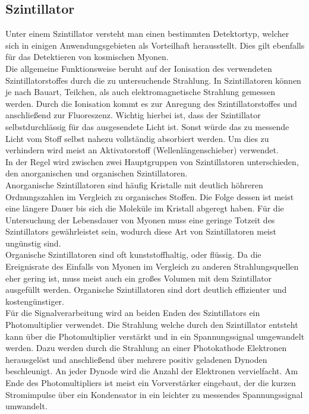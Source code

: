 \subsection{Szintillator}
Unter einem Szintillator versteht man einen bestimmten Detektortyp, welcher sich in einigen Anwendungsgebieten als Vorteilhaft herausstellt. Dies gilt ebenfalls für das
Detektieren von kosmischen Myonen. 
\\
Die allgemeine Funktionsweise beruht auf der Ionisation des verwendeten Szintillatorstoffes durch die zu untersuchende Strahlung. In Szintillatoren können je nach Bauart, Teilchen, als auch elektromagnetische Strahlung 
gemessen werden. Durch die Ionisation kommt es zur Anregung des Szintillatorstoffes und anschließend zur Fluoreszenz. Wichtig hierbei ist, dass der Szintillator selbstdurchlässig für das ausgesendete Licht ist. Sonst würde
das zu messende Licht vom Stoff selbst nahezu vollständig absorbiert werden. Um dies zu verhindern wird meist an Aktivatorstoff (Wellenlängenschieber) verwendet.
\\
In der Regel wird zwischen zwei Hauptgruppen von Szintillatoren unterschieden, den anorganischen und organischen Szintillatoren.
\\
\newline
Anorganische Szintillatoren sind häufig Kristalle mit deutlich höhreren Ordnungszahlen im Vergleich zu organisches Stoffen. Die Folge dessen ist
meist eine längere Dauer bis sich die Moleküle im Kristall abgeregt haben. Für die Untersuchung der Lebensdauer von Myonen muss eine geringe Totzeit des
Szintillators gewährleistet sein, wodurch diese Art von Szintillatoren meist ungünstig sind.
\\
\newline
Organische Szintillatoren sind oft kunststoffhaltig, oder flüssig. Da die Ereignisrate des Einfalls von Myonen im Vergleich zu anderen Strahlungsquellen eher gering ist, muss meist
auch ein großes Volumen mit dem Szintillator ausgefüllt werden. Organische Szintillatoren sind dort deutlich effizienter und kostengünstiger.
\\
\newline
Für die Signalverarbeitung wird an beiden Enden des Szintillators ein Photomultiplier verwendet. 
Die Strahlung welche durch den Szintillator entsteht kann über die Photomultiplier verstärkt und in ein Spannungssignal umgewandelt werden. Dazu werden 
durch die Strahlung an einer Photokathode Elektronen herausgelöst und anschließend über mehrere positiv geladenen Dynoden beschleunigt. An jeder Dynode wird die Anzahl der Elektronen 
vervielfacht. Am Ende des Photomultipliers ist meist ein Vorverstärker eingebaut, der die kurzen Stromimpulse über ein Kondensator in ein leichter zu messendes Spannungssignal umwandelt.

